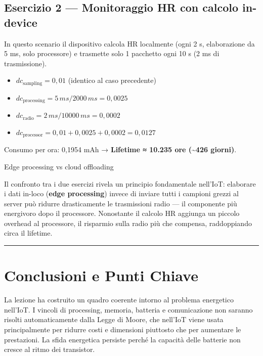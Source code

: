 \documentclass[
  italian,
  openany]{book}
\providecommand{\tightlist}{%
  \setlength{\itemsep}{0pt}\setlength{\parskip}{0pt}}
\begin{document}
\subsection{Esercizio 2 --- Monitoraggio HR con calcolo
in-device}\label{esercizio-2-monitoraggio-hr-con-calcolo-in-device}

In questo scenario il dispositivo calcola HR localmente (ogni 2 s,
elaborazione da 5 ms, solo processore) e trasmette solo 1 pacchetto ogni
10 s (2 ms di trasmissione).

\begin{itemize}
\tightlist
\item
  \(dc_\text{sampling} = 0,01\) (identico al caso precedente)
\item
  \(dc_\text{processing} = 5\,ms / 2000\,ms = 0,0025\)
\item
  \(dc_\text{radio} = 2\,ms / 10000\,ms = 0,0002\)
\item
  \(dc_\text{processor} = 0,01 + 0,0025 + 0,0002 = 0,0127\)
\end{itemize}

Consumo per ora: 0,1954 mAh → \textbf{Lifetime ≈ 10.235 ore
(\textasciitilde426 giorni)}.

\begin{callouttip}{Edge processing vs cloud offloading}

Il confronto tra i due esercizi rivela un principio fondamentale
nell'IoT: elaborare i dati in-loco (\textbf{edge processing}) invece di
inviare tutti i campioni grezzi al server può ridurre drasticamente le
trasmissioni radio --- il componente più energivoro dopo il processore.
Nonostante il calcolo HR aggiunga un piccolo overhead al processore, il
risparmio sulla radio più che compensa, raddoppiando circa il lifetime.

\end{callouttip}

\begin{center}\rule{0.5\linewidth}{0.5pt}\end{center}

\section{Conclusioni e Punti Chiave}\label{conclusioni-e-punti-chiave}

La lezione ha costruito un quadro coerente intorno al problema
energetico nell'IoT. I vincoli di processing, memoria, batteria e
comunicazione non saranno risolti automaticamente dalla Legge di Moore,
che nell'IoT viene usata principalmente per ridurre costi e dimensioni
piuttosto che per aumentare le prestazioni. La sfida energetica persiste
perché la capacità delle batterie non cresce al ritmo dei transistor.
\end{document}

